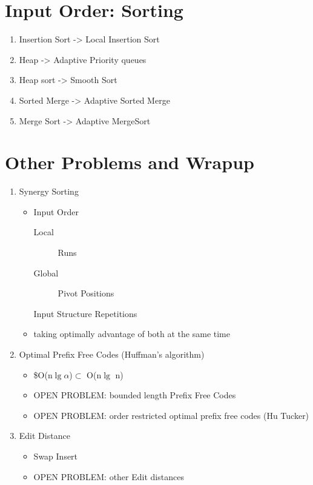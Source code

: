 \documentclass{beamer}
\begin{document}
\section{Input Order: Sorting}
\label{sec-3}
\begin{frame}
\begin{enumerate}
\item Insertion Sort -> Local Insertion Sort
\item Heap -> Adaptive Priority queues
\item Heap sort -> Smooth Sort
\item Sorted Merge -> Adaptive Sorted Merge
\item Merge Sort -> Adaptive MergeSort
  \end{enumerate}
  \end{frame}

\section{Other Problems and Wrapup}
\label{sec-4}

\begin{frame}
\begin{enumerate}
\item Synergy Sorting \cite{2016-ARXIV-SynergisticSortingAndDeferredDataStructuresOnMultiSets-BarbayOchoaRao}
  \begin{itemize}
\item Input Order
  \begin{description}
\item[{Local}] Runs
\item[{Global}] Pivot Positions
  \end{description}
\item[{Input Structure}] Repetitions
\item taking optimally advantage of both at the same time
  \end{itemize}
\item Optimal Prefix Free Codes (Huffman's algorithm)
  \begin{itemize}
\item \$O(n\(\lg \alpha\))\(\subset\) O(n\(\lg\) n) \cite{2016-CPM-OptimalPrefixFreeCodesWithPartialSorting-Barbay}
\item OPEN PROBLEM: bounded length Prefix Free Codes
\item OPEN PROBLEM: order restricted optimal prefix free codes (Hu Tucker)
  \end{itemize}
\item Edit Distance
  \begin{itemize}
\item Swap Insert \cite{2015-SPIRE-AdaptiveComputationOfTheSwapInsertCorrectionDistance-BarbayPerez}
\item OPEN PROBLEM: other Edit distances
  \end{itemize}
  \end{enumerate}
  \end{frame}
\end{document}
